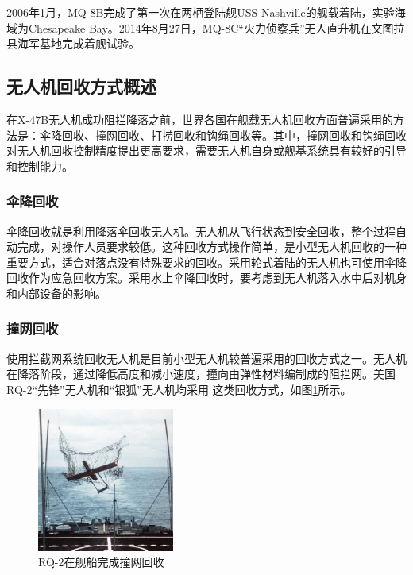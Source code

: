 2006年1月，MQ-8B完成了第一次在两栖登陆舰USS Nashville的舰载着陆，实验海域为Chesapeake Bay。2014年8月27日，MQ-8C“火力侦察兵”无人直升机在文图拉县海军基地完成着舰试验。

\subsection{无人机回收方式概述}
在X-47B无人机成功阻拦降落之前，世界各国在舰载无人机回收方面普遍采用的方法是：伞降回收、撞网回收、打捞回收和钩绳回收等。其中，撞网回收和钩绳回收对无人机回收控制精度提出更高要求，需要无人机自身或舰基系统具有较好的引导和控制能力。

\subsubsection{伞降回收}
伞降回收就是利用降落伞回收无人机。无人机从飞行状态到安全回收，整个过程自动完成，对操作人员要求较低。这种回收方式操作简单，是小型无人机回收的一种重要方式，适合对落点没有特殊要求的回收。采用轮式着陆的无人机也可使用伞降回收作为应急回收方案。采用水上伞降回收时，要考虑到无人机落入水中后对机身和内部设备的影响。

\subsubsection{撞网回收}
使用拦截网系统回收无人机是目前小型无人机较普遍采用的回收方式之一。无人机在降落阶段，通过降低高度和减小速度，撞向由弹性材料编制成的阻拦网。美国RQ-2“先锋”无人机和“银狐”无人机均采用
这类回收方式，如图\ref{fig:34_RQ2_Pioneer_Landing}所示。
\begin{figure}[!tb]   
	\centering	
	\includegraphics[width=0.4\textwidth]{Figs/34_RQ2_Pioneer_Landing.jpg}
	\caption{RQ-2在舰船完成撞网回收}
	\label{fig:34_RQ2_Pioneer_Landing}
\end{figure}


